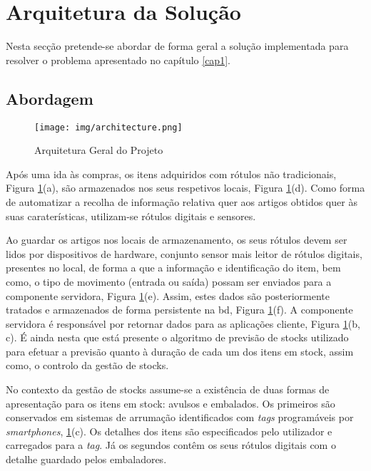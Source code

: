 %
%
\section{Arquitetura da Solução}\label{sec23}

Nesta secção pretende-se abordar de forma geral a solução implementada para resolver o problema apresentado no capítulo \ref{cap1}.

%
%
\subsection{Abordagem}\label{subsec231}

\begin{figure}[H]
	\centering
	\texttt{[image: img/architecture.png]}
	\caption{Arquitetura Geral do Projeto}
	\label{project-general-architecture}
\end{figure}

Após uma ida às compras, os itens adquiridos com rótulos não tradicionais, Figura \ref{project-general-architecture}(a), são armazenados nos seus respetivos locais, Figura \ref{project-general-architecture}(d). Como forma de automatizar a recolha de informação relativa quer aos artigos obtidos quer às suas caraterísticas, utilizam-se rótulos digitais e sensores.

Ao guardar os artigos nos locais de armazenamento, os seus rótulos devem ser lidos por dispositivos de hardware, conjunto sensor mais leitor de rótulos digitais, presentes no local, de forma a que a informação e identificação do item, bem como, o tipo de movimento (entrada ou saída) possam ser enviados para a componente servidora, Figura \ref{project-general-architecture}(e). Assim, estes dados são posteriormente tratados e armazenados de forma persistente na \acrfull{bd}, Figura \ref{project-general-architecture}(f). A componente servidora é responsável por retornar dados para as aplicações cliente, Figura \ref{project-general-architecture}(b, c). É ainda nesta que está presente o algoritmo de previsão de stocks utilizado para efetuar a previsão quanto à duração de cada um dos itens em stock, assim como, o controlo da gestão de stocks.

No contexto da gestão de stocks assume-se a existência de duas formas de apresentação para os itens em stock: avulsos e embalados. Os primeiros são conservados em sistemas de arrumação identificados com \textit{tags} programáveis por \textit{smartphones}, \ref{project-general-architecture}(c). Os detalhes dos itens são especificados pelo utilizador e carregados para a \textit{tag}. Já os segundos contêm os seus rótulos digitais com o detalhe guardado pelos embaladores.

